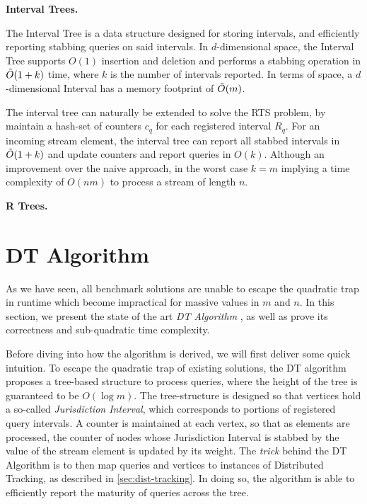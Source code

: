 \textbf{Interval Trees.}

The Interval Tree \cite{DBLP:books/lib/BergCKO08} is a data structure designed for storing intervals, and efficiently reporting stabbing queries on said intervals. In $d$-dimensional space, the Interval Tree supports $O(1)$ insertion and deletion and performs a stabbing operation in $\Tilde{O}(1 + k)$ time, where $k$ is the number of intervals reported. In terms of space, a $d$-dimensional Interval has a memory footprint of $\Tilde{O}(m)$.

The interval tree can naturally be extended to solve the RTS problem, by maintain a hash-set of counters $c_q$ for each registered interval $R_q$. For an incoming stream element, the interval tree can report all stabbed intervals in $\Tilde{O}(1+k)$ and update counters and report queries in $O(k)$. Although an improvement over the naive approach, in the worst case $k =m$ implying a time complexity of $O(nm)$ to process a stream of length $n$.



\textbf{R Trees.}

\section{DT Algorithm}
\label{sec:DT-algorithm}

As we have seen, all benchmark solutions are unable to escape the quadratic trap in runtime which become impractical for massive values in $m$ and $n$. In this section, we present the state of the art \textit{DT Algorithm} \cite{GAN16}, as well as prove its correctness and sub-quadratic time complexity.

Before diving into how the algorithm is derived, we will first deliver some quick intuition. To escape the quadratic trap of existing solutions, the DT algorithm proposes a tree-based structure to process queries, where the height of the tree is guaranteed to be $O(\log m)$. The tree-structure is designed so that vertices hold a so-called \textit{Jurisdiction Interval}, which corresponds to portions of registered query intervals. A counter is maintained at each vertex, so that as elements are processed, the counter of nodes whose Jurisdiction Interval is stabbed by the value of the stream element is updated by its weight. The \textit{trick} behind the DT Algorithm is to then map queries and vertices to instances of Distributed Tracking, as described in \cref{sec:dist-tracking}. In doing so, the algorithm is able to efficiently report the maturity of queries across the tree. 

